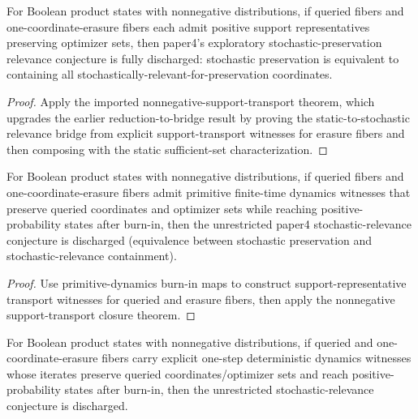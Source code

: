 \begin{theorem}\label{thm:paper4-stochastic-relevance-conjecture-nonneg-support-transport}
For Boolean product states with nonnegative distributions, if queried fibers and one-coordinate-erasure fibers each admit positive support representatives preserving optimizer sets, then paper4's exploratory stochastic-preservation relevance conjecture is fully discharged: stochastic preservation is equivalent to containing all stochastically-relevant-for-preservation coordinates.
\end{theorem}

\begin{proof}
Apply the imported nonnegative-support-transport theorem, which upgrades the earlier reduction-to-bridge result by proving the static-to-stochastic relevance bridge from explicit support-transport witnesses for erasure fibers and then composing with the static sufficient-set characterization.
\end{proof}

\begin{theorem}\label{thm:paper4-stochastic-relevance-conjecture-nonneg-primitive-dynamics}
For Boolean product states with nonnegative distributions, if queried fibers and one-coordinate-erasure fibers admit primitive finite-time dynamics witnesses that preserve queried coordinates and optimizer sets while reaching positive-probability states after burn-in, then the unrestricted paper4 stochastic-relevance conjecture is discharged (equivalence between stochastic preservation and stochastic-relevance containment).
\end{theorem}

\begin{proof}
Use primitive-dynamics burn-in maps to construct support-representative transport witnesses for queried and erasure fibers, then apply the nonnegative support-transport closure theorem.
\end{proof}

\begin{theorem}\label{thm:paper4-stochastic-relevance-conjecture-nonneg-explicit-step-dynamics}
For Boolean product states with nonnegative distributions, if queried and one-coordinate-erasure fibers carry explicit one-step deterministic dynamics witnesses whose iterates preserve queried coordinates/optimizer sets and reach positive-probability states after burn-in, then the unrestricted stochastic-relevance conjecture is discharged.
\end{theorem}

